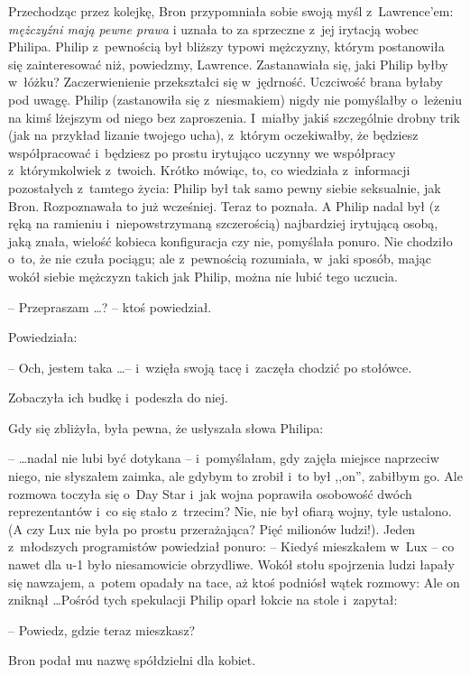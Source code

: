 \documentclass[oneside,polish,11pt,rmheadings]{mwbk}
\begin{document}
Przechodząc przez kolejkę, Bron przypomniała sobie swoją myśl z~Lawrence'em: \textit{mężczyźni mają pewne prawa }i uznała to za sprzeczne z~jej irytacją wobec Philipa. Philip z~pewnością był bliższy typowi mężczyzny, którym postanowiła się zainteresować niż, powiedzmy, Lawrence. Zastanawiała się, jaki Philip byłby w~łóżku? Zaczerwienienie przekształci się w~jędrność. Uczciwość brana byłaby pod uwagę. Philip (zastanowiła się z~niesmakiem) nigdy nie pomyślałby o~leżeniu na kimś lżejszym od niego bez zaproszenia. I~miałby jakiś szczególnie drobny trik (jak na przykład lizanie twojego ucha), z~którym oczekiwałby, że będziesz współpracować i~będziesz po prostu irytująco uczynny we współpracy z~którymkolwiek z~twoich. Krótko mówiąc, to, co wiedziała z~informacji pozostałych z~tamtego życia: Philip był tak samo pewny siebie seksualnie, jak Bron. Rozpoznawała to już wcześniej. Teraz to poznała. A Philip nadal był (z ręką na ramieniu i~niepowstrzymaną szczerością) najbardziej irytującą osobą, jaką znała, wielość kobieca konfiguracja czy nie, pomyślała ponuro. Nie chodziło o~to, że nie czuła pociągu; ale z~pewnością rozumiała, w~jaki sposób, mając wokół siebie mężczyzn takich jak Philip, można nie lubić tego uczucia. 

-- Przepraszam  \ldots  ? --  ktoś powiedział. 

Powiedziała: 

-- Och, jestem taka \ldots -- i~wzięła swoją tacę i~zaczęła chodzić po stołówce. 

Zobaczyła ich budkę i~podeszła do niej. 

Gdy się zbliżyła, była pewna, że usłyszała słowa Philipa: 

--  \ldots nadal nie lubi być dotykana --  i~pomyślałam, gdy zajęła miejsce naprzeciw niego, nie słyszałem zaimka, ale gdybym to zrobił i~to był ,,on'', zabiłbym go. Ale rozmowa toczyła się o~Day Star i~jak wojna poprawiła osobowość dwóch reprezentantów i~co się stało z~trzecim? Nie, nie był ofiarą wojny, tyle ustalono. (A czy Lux nie była po prostu przerażająca? Pięć milionów ludzi!). Jeden z~młodszych programistów powiedział ponuro: -- Kiedyś mieszkałem w~Lux -- co nawet dla u-1 było niesamowicie obrzydliwe. Wokół stołu spojrzenia ludzi łapały się nawzajem, a~potem opadały na tace, aż ktoś podniósł wątek rozmowy: Ale on zniknął  \ldots   Pośród tych spekulacji Philip oparł łokcie na stole i~zapytał: 

-- Powiedz, gdzie teraz mieszkasz?  

Bron podał mu nazwę spółdzielni dla kobiet. 
\end{document}
